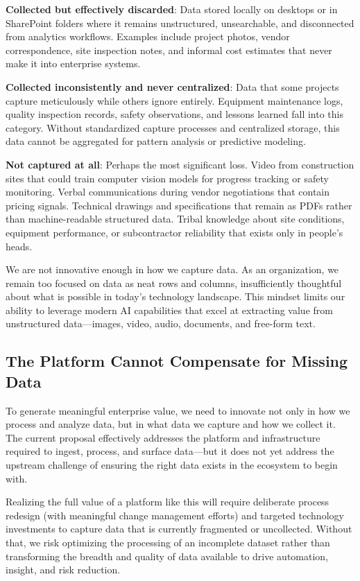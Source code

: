 \documentclass[12pt, a4paper]{article}
\begin{document}
\textbf{Collected but effectively discarded}: Data stored locally on desktops or in SharePoint folders where it remains unstructured, unsearchable, and disconnected from analytics workflows. Examples include project photos, vendor correspondence, site inspection notes, and informal cost estimates that never make it into enterprise systems.

\textbf{Collected inconsistently and never centralized}: Data that some projects capture meticulously while others ignore entirely. Equipment maintenance logs, quality inspection records, safety observations, and lessons learned fall into this category. Without standardized capture processes and centralized storage, this data cannot be aggregated for pattern analysis or predictive modeling.

\textbf{Not captured at all}: Perhaps the most significant loss. Video from construction sites that could train computer vision models for progress tracking or safety monitoring. Verbal communications during vendor negotiations that contain pricing signals. Technical drawings and specifications that remain as PDFs rather than machine-readable structured data. Tribal knowledge about site conditions, equipment performance, or subcontractor reliability that exists only in people's heads.

We are not innovative enough in how we capture data. As an organization, we remain too focused on data as neat rows and columns, insufficiently thoughtful about what is possible in today's technology landscape. This mindset limits our ability to leverage modern AI capabilities that excel at extracting value from unstructured data—images, video, audio, documents, and free-form text.

\subsection{The Platform Cannot Compensate for Missing Data}

To generate meaningful enterprise value, we need to innovate not only in how we process and analyze data, but in what data we capture and how we collect it. The current proposal effectively addresses the platform and infrastructure required to ingest, process, and surface data—but it does not yet address the upstream challenge of ensuring the right data exists in the ecosystem to begin with.

Realizing the full value of a platform like this will require deliberate process redesign (with meaningful change management efforts) and targeted technology investments to capture data that is currently fragmented or uncollected. Without that, we risk optimizing the processing of an incomplete dataset rather than transforming the breadth and quality of data available to drive automation, insight, and risk reduction.
\end{document}
